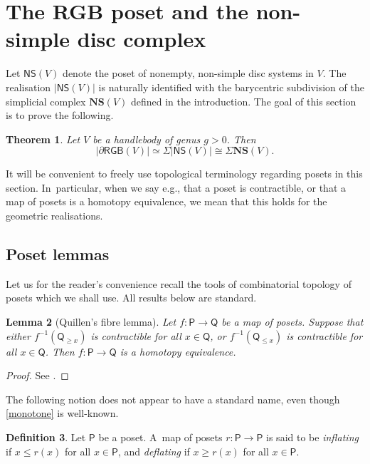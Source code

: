 \documentclass[11pt]{article}
\newcommand{\eg}{e.g.,\xspace}
\theoremstyle{plain}
\newtheorem{thm}{Theorem}[section]
\newtheorem{lem}[thm]{Lemma}
\theoremstyle{definition}
\newtheorem{defn}[thm]{Definition}
\newcommand{\dRGB}{\partial\mathsf{RGB}}
\newcommand{\NS}{\mathsf{NS}}
\newcommand{\compNS}{\mathbf{NS}}
\newcommand{\Po}{\mathsf{P}}
\begin{document}
\section{The RGB poset and the non-simple disc complex} \label{s:poset}

Let $\NS(V)$ denote the poset of nonempty, non-simple disc systems in $V$. The realisation $|\NS(V)|$ is naturally identified with the barycentric subdivision of the simplicial complex $\compNS(V)$ defined in the introduction. The goal of this section is to prove the following.
\begin{thm}\label{thm:simplifying}Let $V$ be a handlebody of genus $g>0$. Then
\[
|\dRGB(V)| \simeq \Sigma |\NS(V)| \cong \Sigma \compNS(V).
\]
\end{thm}

It will be convenient to freely use topological terminology regarding posets in this section. In~particular, when we say \eg that a poset is contractible, or that a map of posets is a homotopy equivalence, we mean that this holds for the geometric realisations.

\subsection{Poset lemmas}
Let us for the reader's convenience recall the tools of combinatorial topology of posets which we shall use. All results below are standard.

\begin{lem}[Quillen's fibre lemma] \label{lemma:fibre_lemma} Let $f:\mathsf P \to \mathsf Q$ be a map of posets. Suppose that either $f^{-1}(\mathsf Q_{\geq x})$ is contractible for all $x \in \mathsf Q$, or $f^{-1}(\mathsf Q_{\leq x})$ is contractible for all $x \in \mathsf Q$. Then $f \colon \mathsf P\to\mathsf Q $ is a homotopy equivalence. \end{lem}

\begin{proof}
See \cite[Prop.\,1.6]{quillen-homotopyproperties}.
\end{proof}

The following notion does not appear to have a standard name, even though \cref{monotone} is well-known.

\begin{defn}
Let $\Po$ be a poset. A~map of posets $r:\Po \to \Po$ is said to be \emph{inflating} if $x \leq r(x)$ for all $x \in \Po$, and \emph{deflating} if $x \geq r(x)$ for all $x \in \Po.$
\end{defn}
\end{document}
